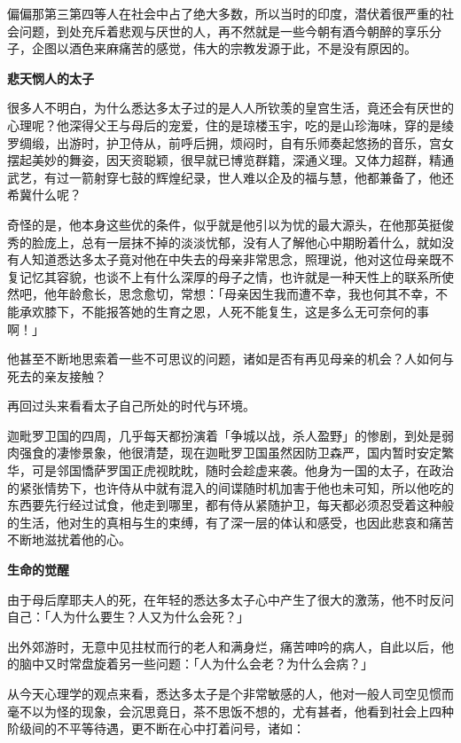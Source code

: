 \documentclass[12pt,twoside,openany]{book}
\newcommand{\mt}[1]{\textbullet \textbf{#1}}
\begin{document}
偏偏那第三第四等人在社会中占了绝大多数，所以当时的印度，潜伏着很严重的社会问题，到处充斥着悲观与厌世的人，再不然就是一些今朝有酒今朝醉的享乐分子，企图以酒色来麻痛苦的感觉，伟大的宗教发源于此，不是没有原因的。

\mt{悲天悯人的太子}

很多人不明白，为什么悉达多太子过的是人人所钦羡的皇宫生活，竟还会有厌世的心理呢？他深得父王与母后的宠爱，住的是琼楼玉宇，吃的是山珍海味，穿的是绫罗绸缎，出游时，护卫侍从，前呼后拥，烦闷时，自有乐师奏起悠扬的音乐，宫女摆起美妙的舞姿，因天资聪颖，很早就已博览群籍，深通义理。又体力超群，精通武艺，有过一箭射穿七鼓的辉煌纪录，世人难以企及的福与慧，他都兼备了，他还希冀什么呢？

奇怪的是，他本身这些优的条件，似乎就是他引以为忧的最大源头，在他那英挺俊秀的脸庞上，总有一层抹不掉的淡淡忧郁，没有人了解他心中期盼着什么，就如没有人知道悉达多太子竟对他在中失去的母亲非常思念，照理说，他对这位母亲既不复记忆其容貌，也谈不上有什么深厚的母子之情，也许就是一种天性上的联系所使然吧，他年龄愈长，思念愈切，常想：「母亲因生我而遭不幸，我也何其不幸，不能承欢膝下，不能报答她的生育之恩，人死不能复生，这是多么无可奈何的事啊！」

他甚至不断地思索着一些不可思议的问题，诸如是否有再见母亲的机会？人如何与死去的亲友接触？

再回过头来看看太子自己所处的时代与环境。

迦毗罗卫国的四周，几乎每天都扮演着「争城以战，杀人盈野」的惨剧，到处是弱肉强食的凄惨景象，他很清楚，现在迦毗罗卫国虽然因防卫森严，国内暂时安定繁华，可是邻国憍萨罗国正虎视眈眈，随时会趁虚来袭。他身为一国的太子，在政治的紧张情势下，也许侍从中就有混入的间谍随时机加害于他也未可知，所以他吃的东西要先行经过试食，他走到哪里，都有侍从紧随护卫，每天都必须忍受着这种般的生活，他对生的真相与生的束缚，有了深一层的体认和感受，也因此悲哀和痛苦不断地滋扰着他的心。

\mt{生命的觉醒}

由于母后摩耶夫人的死，在年轻的悉达多太子心中产生了很大的激荡，他不时反问自己：「人为什么要生？人又为什么会死？」

出外郊游时，无意中见拄杖而行的老人和满身烂，痛苦呻吟的病人，自此以后，他的脑中又时常盘旋着另一些问题：「人为什么会老？为什么会病？」

从今天心理学的观点来看，悉达多太子是个非常敏感的人，他对一般人司空见惯而毫不以为怪的现象，会沉思竟日，茶不思饭不想的，尤有甚者，他看到社会上四种阶级间的不平等待遇，更不断在心中打着问号，诸如：
\end{document}
